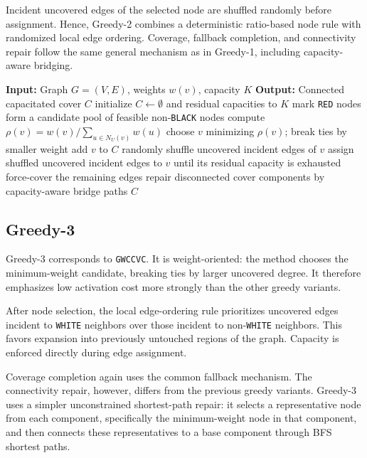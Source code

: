 \documentclass[11pt]{article}
\begin{document}
Incident uncovered edges of the selected node are shuffled randomly before assignment. Hence, Greedy-2 combines a deterministic ratio-based node rule with randomized local edge ordering. Coverage, fallback completion, and connectivity repair follow the same general mechanism as in Greedy-1, including capacity-aware bridging.

\begin{algorithm}[h]
\caption{Greedy-2 / GRCCVC}
\begin{algorithmic}[1]
\State \textbf{Input:} Graph \(G=(V,E)\), weights \(w(v)\), capacity \(K\)
\State \textbf{Output:} Connected capacitated cover \(C\)
\State initialize \(C\gets\emptyset\) and residual capacities to \(K\)
    \State mark \texttt{RED} nodes
    \State form a candidate pool of feasible non-\texttt{BLACK} nodes
        \State compute \(\rho(v)=w(v)/\sum_{u\in N_U(v)}w(u)\)
    \EndFor
    \State choose \(v\) minimizing \(\rho(v)\); break ties by smaller weight
    \State add \(v\) to \(C\)
    \State randomly shuffle uncovered incident edges of \(v\)
    \State assign shuffled uncovered incident edges to \(v\) until its residual capacity is exhausted
\EndWhile
{}
    \State force-cover the remaining edges
\EndIf
\State repair disconnected cover components by capacity-aware bridge paths
\State \Return \(C\)
\end{algorithmic}
\end{algorithm}

\subsection{Greedy-3}

Greedy-3 corresponds to \texttt{GWCCVC}. It is weight-oriented: the method chooses the minimum-weight candidate, breaking ties by larger uncovered degree. It therefore emphasizes low activation cost more strongly than the other greedy variants.

After node selection, the local edge-ordering rule prioritizes uncovered edges incident to \texttt{WHITE} neighbors over those incident to non-\texttt{WHITE} neighbors. This favors expansion into previously untouched regions of the graph. Capacity is enforced directly during edge assignment.

Coverage completion again uses the common fallback mechanism. The connectivity repair, however, differs from the previous greedy variants. Greedy-3 uses a simpler unconstrained shortest-path repair: it selects a representative node from each component, specifically the minimum-weight node in that component, and then connects these representatives to a base component through BFS shortest paths.
\end{document}
